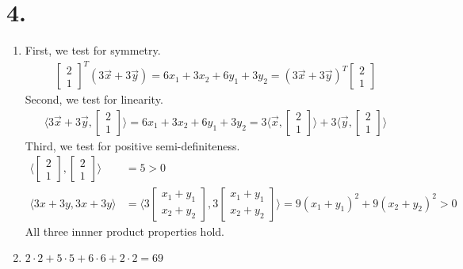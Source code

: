 \documentclass[11pt]{article}
\newenvironment{qparts}{\begin{enumerate}[{(}a{)}]}{\end{enumerate}}
\begin{document}
\section*{4.}
\begin{qparts}
\item
First, we test for symmetry.
\begin{align*}
    \begin{bmatrix}2\\1\end{bmatrix}^T (3\vec{x} + 3\vec{y}) = 6x_1+3x_2 + 6y_1+3y_2 = {(3\vec{x} + 3\vec{y})}^T \begin{bmatrix}2\\1\end{bmatrix}
\end{align*}
Second, we test for linearity.
\begin{align*}
    \langle3\vec{x} + 3\vec{y}, \begin{bmatrix}2\\1\end{bmatrix}\rangle = 6x_1+3x_2 + 6y_1+3y_2 =
    3\langle\vec{x}, \begin{bmatrix}2\\1\end{bmatrix}\rangle + 3\langle\vec{y}, \begin{bmatrix}2\\1\end{bmatrix}\rangle
\end{align*}
Third, we test for positive semi-definiteness.
\begin{align*}
    \langle \begin{bmatrix}2\\1\end{bmatrix}, \begin{bmatrix}2\\1\end{bmatrix}\rangle &= 5 > 0& \\
    \langle 3x+3y, 3x + 3y \rangle 
    &= \langle 3 \begin{bmatrix}x_1 + y_1\\x_2+y_2\end{bmatrix}, 3 \begin{bmatrix}x_1 + y_1\\x_2+y_2\end{bmatrix}\rangle 
    = 9(x_1+y_1)^2 + 9(x_2+y_2)^2 > 0&
\end{align*}
All three innner product properties hold.

\item
$2 \cdot 2 + 5 \cdot 5 + 6 \cdot 6 + 2 \cdot 2 = 69$
\end{qparts}
\end{document}

